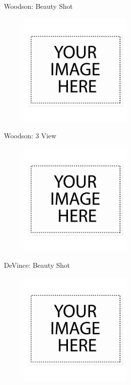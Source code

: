 \documentclass[10pt]{beamer}
\begin{document}
	\begin{frame}{Woodson: Beauty Shot}
\begin{figure}
	\centering
	\includegraphics[width=0.5\textwidth]{Woodson_Beauty.png}
\end{figure}
\end{frame}

	\begin{frame}{Woodson: 3 View}
\begin{figure}
	\centering
	\includegraphics[width=0.5\textwidth]{Woodson_3_View.png}
\end{figure}
\end{frame}

	\begin{frame}{DeVince: Beauty Shot}
\begin{figure}
	\centering
	\includegraphics[width=0.5\textwidth]{DeVince_Beauty.png}
\end{figure}
\end{frame}
\end{document}
